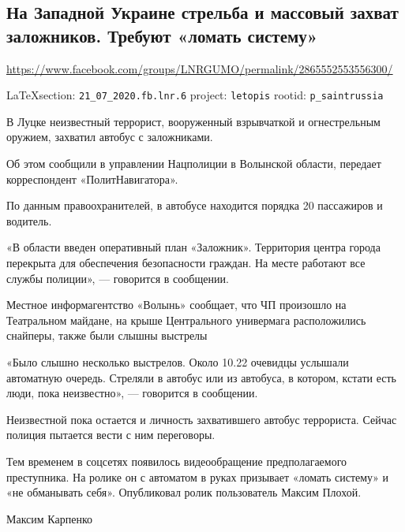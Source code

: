  
 
\subsection{На Западной Украине стрельба и массовый захват заложников. Требуют «ломать систему»}
\label{sec:21_07_2020.fb.lnr.6}
\url{https://www.facebook.com/groups/LNRGUMO/permalink/2865552553556300/}
  
\vspace{0.5cm}
{\small\LaTeX section: \verb|21_07_2020.fb.lnr.6| project: \verb|letopis| rootid: \verb|p_saintrussia|}
\vspace{0.5cm}


В Луцке неизвестный террорист, вооруженный взрывчаткой и огнестрельным оружием,
захватил автобус с заложниками.

Об этом сообщили в управлении Нацполиции в Волынской области, передает
корреспондент «ПолитНавигатора».

По данным правоохранителей, в автобусе находится порядка 20 пассажиров и
водитель.

«В области введен оперативный план «Заложник». Территория центра города
перекрыта для обеспечения безопасности граждан. На месте работают все службы
полиции», --- говорится в сообщении.

Местное информагентство «Волынь» сообщает, что ЧП произошло на Театральном
майдане, на крыше Центрального универмага расположились снайперы, также были
слышны выстрелы

«Было слышно несколько выстрелов. Около 10.22 очевидцы услышали автоматную
очередь. Стреляли в автобус или из автобуса, в котором, кстати есть люди, пока
неизвестно», --- говорится в сообщении.

Неизвестной пока остается и личность захватившего автобус террориста. Сейчас
полиция пытается вести с ним переговоры.

Тем временем в соцсетях появилось видеообращение предполагаемого преступника.
На ролике он с автоматом в руках призывает «ломать систему» и «не обманывать
себя». Опубликовал ролик пользователь Максим Плохой.

Максим Карпенко
  
